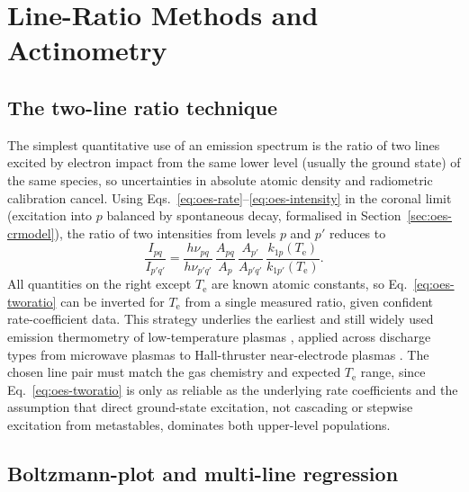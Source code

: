 \section{Line-Ratio Methods and Actinometry}
\label{sec:oes-lineratio}

\subsection{The two-line ratio technique}

The simplest quantitative use of an emission spectrum is the ratio of two lines excited by electron impact from the same lower level (usually the ground state) of the same species, so uncertainties in absolute atomic density and radiometric calibration cancel. Using Eqs.~\eqref{eq:oes-rate}--\eqref{eq:oes-intensity} in the coronal limit (excitation into $p$ balanced by spontaneous decay, formalised in Section~\ref{sec:oes-crmodel}), the ratio of two intensities from levels $p$ and $p'$ reduces to
\begin{equation}
\frac{I_{pq}}{I_{p'q'}} = \frac{h\nu_{pq}}{h\nu_{p'q'}} \, \frac{A_{pq}}{A_{p}} \, \frac{A_{p'}}{A_{p'q'}} \, \frac{k_{1p}(T_{\mathrm{e}})}{k_{1p'}(T_{\mathrm{e}})} .
\label{eq:oes-tworatio}
\end{equation}
All quantities on the right except $T_{\mathrm{e}}$ are known atomic constants, so Eq.~\eqref{eq:oes-tworatio} can be inverted for $T_{\mathrm{e}}$ from a single measured ratio, given confident rate-coefficient data. This strategy underlies the earliest and still widely used emission thermometry of low-temperature plasmas \cite{ref0231}, applied across discharge types from microwave plasmas to Hall-thruster near-electrode plasmas \cite{ref0256}. The chosen line pair must match the gas chemistry and expected $T_{\mathrm{e}}$ range, since Eq.~\eqref{eq:oes-tworatio} is only as reliable as the underlying rate coefficients and the assumption that direct ground-state excitation, not cascading or stepwise excitation from metastables, dominates both upper-level populations.

\subsection{Boltzmann-plot and multi-line regression}

